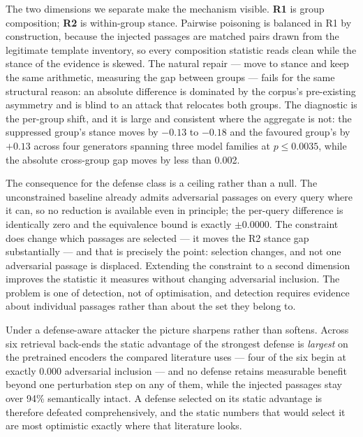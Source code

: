\documentclass[authoryear,review,3p,times]{elsarticle}
\begin{document}
The two dimensions we separate make the mechanism visible. \textbf{R1} is group composition; \textbf{R2} is within-group stance. Pairwise poisoning is balanced in R1 by construction, because the injected passages are matched pairs drawn from the legitimate template inventory, so every composition statistic reads clean while the stance of the evidence is skewed. The natural repair --- move to stance and keep the same arithmetic, measuring the gap between groups --- fails for the same structural reason: an absolute difference is dominated by the corpus's pre-existing asymmetry and is blind to an attack that relocates both groups. The diagnostic is the per-group shift, and it is large and consistent where the aggregate is not: the suppressed group's stance moves by \(-0.13\) to \(-0.18\) and the favoured group's by \(+0.13\) across four generators spanning three model families at \(p \le 0.0035\), while the absolute cross-group gap moves by less than 0.002.

The consequence for the defense class is a ceiling rather than a null. The unconstrained baseline already admits adversarial passages on every query where it can, so no reduction is available even in principle; the per-query difference is identically zero and the equivalence bound is exactly \(\pm 0.0000\). The constraint does change which passages are selected --- it moves the R2 stance gap substantially --- and that is precisely the point: selection changes, and not one adversarial passage is displaced. Extending the constraint to a second dimension improves the statistic it measures without changing adversarial inclusion. The problem is one of detection, not of optimisation, and detection requires evidence about individual passages rather than about the set they belong to.

Under a defense-aware attacker the picture sharpens rather than softens. Across six retrieval back-ends the static advantage of the strongest defense is \emph{largest} on the pretrained encoders the compared literature uses --- four of the six begin at exactly 0.000 adversarial inclusion --- and no defense retains measurable benefit beyond one perturbation step on any of them, while the injected passages stay over 94\% semantically intact. A defense selected on its static advantage is therefore defeated comprehensively, and the static numbers that would select it are most optimistic exactly where that literature looks.
\end{document}
